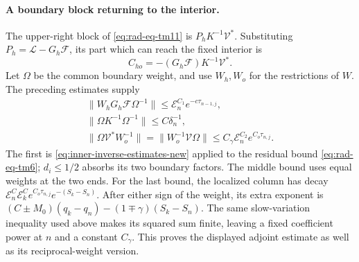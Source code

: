 \paragraph{A boundary block returning to the interior.}
The upper-right block of \eqref{eq:rad-eq-tm11} is
$P_hK^{-1}\mathcal V^*$.  Substituting
$P_h=\mathcal L-G_h\mathcal F$, its part which can reach the fixed
interior is
\[
 C_{ho}=-(G_h\mathcal F)K^{-1}\mathcal V^*.
\]
Let $\Omega$ be the common boundary weight, and use $W_h,W_o$ for
the restrictions of $W$.  The preceding estimates supply
\begin{equation}\label{eq:boundary-column-weights}
 \begin{gathered}
 \|W_hG_h\mathcal F\Omega^{-1}\|
       \le\mathcal E_n^{C_1}e^{-c\tau_{n-1,j}},\\
 \|\Omega K^{-1}\Omega^{-1}\|\le C\delta_n^{-1},\\
 \|\Omega\mathcal V^*W_o^{-1}\|
       =\|W_o^{-1}\mathcal V\Omega\|
       \le C_\gamma\mathcal E_n^{C_2}e^{C_o\tau_{n,j}}.
 \end{gathered}
\end{equation}
The first is \eqref{eq:inner-inverse-estimates-new} applied to the
residual bound \eqref{eq:rad-eq-tm6}; $d_i\le1/2$ absorbs its two
boundary factors.  The middle bound uses equal weights at the two
ends.  For the last bound, the localized column has decay
$\mathcal E_n^C\mathcal E_k^C e^{C_o\tau_{n,j}}e^{-(S_k-S_n)}$.
After either sign of the weight, its extra exponent is
$(C\pm M_0)(q_k-q_n)-(1\mp\gamma)(S_k-S_n)$.
The same slow-variation inequality used above makes its squared sum
finite, leaving a fixed coefficient power at $n$ and a constant
$C_\gamma$.  This proves the displayed adjoint estimate as well as its
reciprocal-weight version.

